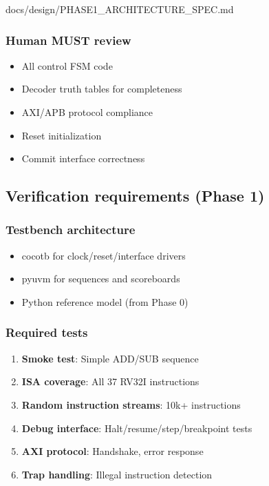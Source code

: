 \begin{relocated}{docs/design/PHASE1_ARCHITECTURE_SPEC.md}
\subsubsection{Human MUST review}\label{ds:ch:phase1-architecture:human-must-review}

\begin{itemize}
\tightlist
\item
  All control FSM code
\item
  Decoder truth tables for completeness
\item
  AXI/APB protocol compliance
\item
  Reset initialization
\item
  Commit interface correctness
\end{itemize}

\subsection{Verification requirements (Phase 1)}\label{ds:ch:phase1-architecture:verification-requirements-phase-1}

\subsubsection{Testbench architecture}\label{ds:ch:phase1-architecture:testbench-architecture}

\begin{itemize}
\tightlist
\item
  cocotb for clock/\allowbreak{}reset/\allowbreak{}interface drivers
\item
  pyuvm for sequences and scoreboards
\item
  Python reference model (from Phase 0)
\end{itemize}

\subsubsection{Required tests}\label{ds:ch:phase1-architecture:required-tests}

\begin{enumerate}
\def\labelenumi{\arabic{enumi}.}
\tightlist
\item
  \textbf{Smoke test}: Simple ADD/SUB sequence
\item
  \textbf{ISA coverage}: All 37 RV32I instructions
\item
  \textbf{Random instruction streams}: 10k+ instructions
\item
  \textbf{Debug interface}:
  Halt/\allowbreak{}resume/\allowbreak{}step/\allowbreak{}breakpoint
  tests
\item
  \textbf{AXI protocol}: Handshake, error response
\item
  \textbf{Trap handling}: Illegal instruction detection
\end{enumerate}


\end{relocated}
